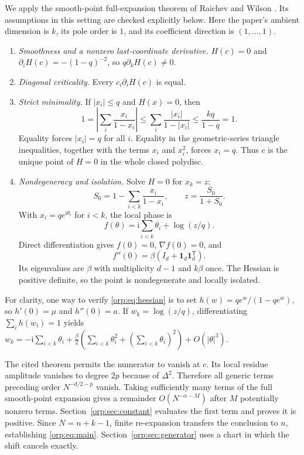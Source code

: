\documentclass[11pt]{article}
\theoremstyle{remark}\newtheorem{remark}[theorem]{Remark}
\newcommand{\ii}{\mathrm i}
\begin{document}
We apply the smooth-point full-expansion theorem of Raichev and Wilson \cite[Definition~3.1 and Theorem~3.2]{rw}. Its assumptions in this setting are checked explicitly below. Here the paper's ambient dimension is $k$, its pole order is $1$, and its coefficient direction is $(1,\ldots,1)$.
\begin{enumerate}[label=\arabic*.]
\item \emph{Smoothness and a nonzero last-coordinate derivative.}
$H(c)=0$ and $\partial_iH(c)=-(1-q)^{-2}$, so $q\partial_kH(c)\ne0$.
\item \emph{Diagonal criticality.} Every $c_i\partial_iH(c)$ is equal.
\item \emph{Strict minimality.} If $|x_i|\le q$ and $H(x)=0$, then
\[
 1=\left|\sum_i\frac{x_i}{1-x_i}\right|
 \le\sum_i\frac{|x_i|}{1-|x_i|}\le\frac{kq}{1-q}=1.
\]
Equality forces $|x_i|=q$ for all $i$. Equality in the geometric-series triangle inequalities, together with the terms $x_i$ and $x_i^2$, forces $x_i=q$. Thus $c$ is the unique point of $H=0$ in the whole closed polydisc.
\item \emph{Nondegeneracy and isolation.} Solve $H=0$ for $x_k=z$:
\[
 S_0=1-\sum_{i<k}\frac{x_i}{1-x_i},\qquad z=\frac{S_0}{1+S_0}.
\]
With $x_i=q e^{\ii\theta_i}$ for $i<k$, the local phase is
\[
 f(\theta)=\ii\sum_{i<k}\theta_i+\log(z/q).
\]
Direct differentiation gives $f(0)=0$, $\nabla f(0)=0$, and
\begin{equation}\label{orp:eq:hessian}
 f''(0)=\beta(I_d+\mathbf1_d\mathbf1_d^{\mathsf T}).
\end{equation}
Its eigenvalues are $\beta$ with multiplicity $d-1$ and $k\beta$ once. The Hessian is positive definite, so the point is nondegenerate and locally isolated.
\end{enumerate}
For clarity, one way to verify \eqref{orp:eq:hessian} is to set
$h(w)=qe^w/(1-qe^w)$, so $h'(0)=\mu$ and $h''(0)=a$. If $w_k=\log(z/q)$, differentiating $\sum_i h(w_i)=1$ yields
$w_k=-\ii\sum_{i<k}\theta_i+\frac\beta2(\sum_{i<k}\theta_i^2+(\sum_{i<k}\theta_i)^2)+O(|\theta|^3)$.

The cited theorem permits the numerator to vanish at $c$. Its local residue amplitude vanishes to degree $2p$ because of $\Delta^2$. Therefore all generic terms preceding order $N^{-d/2-p}$ vanish. Taking sufficiently many terms of the full smooth-point expansion gives a remainder $O(N^{-\alpha-M})$ after $M$ potentially nonzero terms. Section~\ref{orp:sec:constant} evaluates the first term and proves it is positive. Since $N=n+k-1$, finite re-expansion transfers the conclusion to $n$, establishing \eqref{orp:eq:main}. Section~\ref{orp:sec:generator} uses a chart in which the shift cancels exactly.
\end{document}
